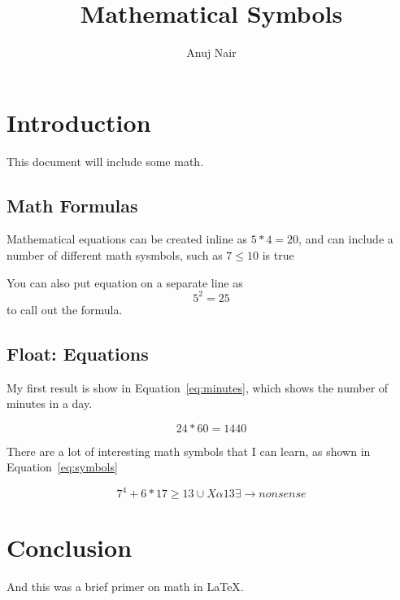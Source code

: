 \documentclass{article}
\title{Mathematical Symbols}
\author{Anuj Nair}
\date{}
\begin{document}
\maketitle

\section{Introduction}
This document will include some math.
				\subsection{Math Formulas}

  Mathematical equations can be created inline as $5*4=20$, and can include a number of different math sysmbols, such as $7\leq 10$ is true

	You can also put equation on a separate line as \[5^2=25\] to call out the formula.

				
				\subsection{Float: Equations}  

  My first result is show in Equation~\ref{eq:minutes}, which shows the number of minutes in a day.

  \begin{equation}
		24*60=1440
		\label{eq:minutes}
	\end{equation}

  There are a lot of interesting math symbols that I can learn, as shown in Equation~\ref{eq:symbols}

  \begin{equation}
		7^4+6*17\geq 13 \cup X \alpha 13 \exists \rightarrow nonsense
		\label{eq:symbols}
	\end{equation}

   
				

\section{Conclusion}

And this was a brief primer on math in {\LaTeX}.

 
\end{document}
